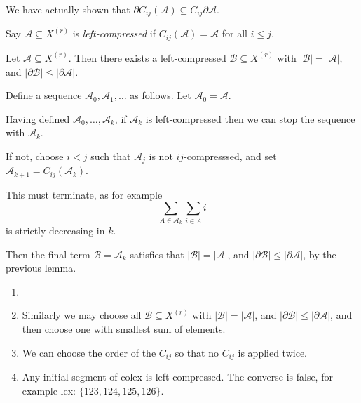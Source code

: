 \documentclass[12pt]{article}
\begin{document}
\begin{remark}
	We have actually shown that $\partial C_{ij}(\mathcal{A}) \subseteq C_{ij} \partial \mathcal{A}$.
\end{remark}

Say $\mathcal{A} \subseteq X^{(r)}$ is \emph{left-compressed} if $C_{ij}(\mathcal{A}) = \mathcal{A}$ for all $i \leq j$.

\begin{corollary}
	Let $\mathcal{A} \subseteq X^{(r)}$. Then there exists a left-compressed $\mathcal{B} \subseteq X^{(r)}$ with $|\mathcal{B}| = |\mathcal{A}|$, and $|\partial \mathcal{B}| \leq |\partial \mathcal{A}|$.
\end{corollary}

\begin{proofbox}
	Define a sequence $\mathcal{A}_0, \mathcal{A}_1, \ldots$ as follows. Let $\mathcal{A}_0 = \mathcal{A}$.

	Having defined $\mathcal{A}_0, \ldots, \mathcal{A}_k$, if $\mathcal{A}_k$ is left-compressed then we can stop the sequence with $\mathcal{A}_k$.

	If not, choose $i < j$ such that $\mathcal{A}_j$ is not $ij$-compresssed, and set $\mathcal{A}_{k+1} = C_{ij}(\mathcal{A}_k)$.

	This must terminate, as for example
	\[
	\sum_{A \in \mathcal{A}_k} \sum_{i \in A} i
	\]
	is strictly decreasing in $k$.

	Then the final term $\mathcal{B} = \mathcal{A}_k$ satisfies that $|\mathcal{B}| = |\mathcal{A}|$, and $|\partial \mathcal{B}| \leq |\partial \mathcal{A}|$, by the previous lemma.
\end{proofbox}

\begin{remark}
	\begin{enumerate}
		\item[]
		\item Similarly we may choose all $\mathcal{B} \subseteq X^{(r)}$ with $|\mathcal{B}| = |\mathcal{A}|$, and $|\partial \mathcal{B}| \leq |\partial \mathcal{A}|$, and then choose one with smallest sum of elements.
		\item We can choose the order of the $C_{ij}$ so that no $C_{ij}$ is applied twice.
		\item Any initial segment of colex is left-compressed. The converse is false, for example lex: $\{123, 124, 125, 126\}$.
	\end{enumerate}	
\end{remark}
\end{document}
